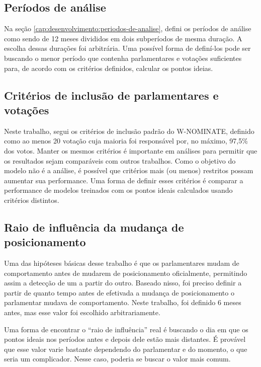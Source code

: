 \documentclass[a4paper,titlepage]{ppgi}\usepackage[]{graphicx}\usepackage[]{color}
\begin{document}
\subsection{Períodos de análise}

Na seção \ref{cap:desenvolvimento:periodos-de-analise}, defini os períodos de
análise como sendo de 12 meses divididos em dois subperíodos de mesma duração.
A escolha dessas durações foi arbitrária. Uma possível forma de definí-los pode
ser buscando o menor período que contenha parlamentares e votações suficientes
para, de acordo com os critérios definidos, calcular os pontos ideias.

\subsection{Critérios de inclusão de parlamentares e votações}

Neste trabalho, segui os critérios de inclusão padrão do W-NOMINATE, definido
como ao menos 20 votação cuja maioria foi responsável por, no máximo, 97,5\%
dos votos. Manter os mesmos critérios é importante em análises para permitir
que os resultados sejam comparáveis com outros trabalhos. Como o objetivo do
modelo não é a análise, é possível que critérios mais (ou menos) restritos
possam aumentar sua performance. Uma forma de definir esses critérios é
comparar a performance de modelos treinados com os pontos ideais calculados
usando critérios distintos.

\subsection{Raio de influência da mudança de posicionamento}

Uma das hipóteses básicas desse trabalho é que os parlamentares mudam de
comportamento antes de mudarem de posicionamento oficialmente, permitindo assim
a detecção de um a partir do outro. Baseado nisso, foi preciso definir a partir
de quanto tempo antes de efetivada a mudança de posicionamento o parlamentar
mudava de comportamento. Neste trabalho, foi definido 6 meses antes, mas esse
valor foi escolhido arbitrariamente.

Uma forma de encontrar o ``raio de influência'' real é buscando o dia em que os
pontos ideais nos períodos antes e depois dele estão mais distantes. É provável
que esse valor varie bastante dependendo do parlamentar e do momento, o que
seria um complicador. Nesse caso, poderia se buscar o valor mais comum.
\end{document}
